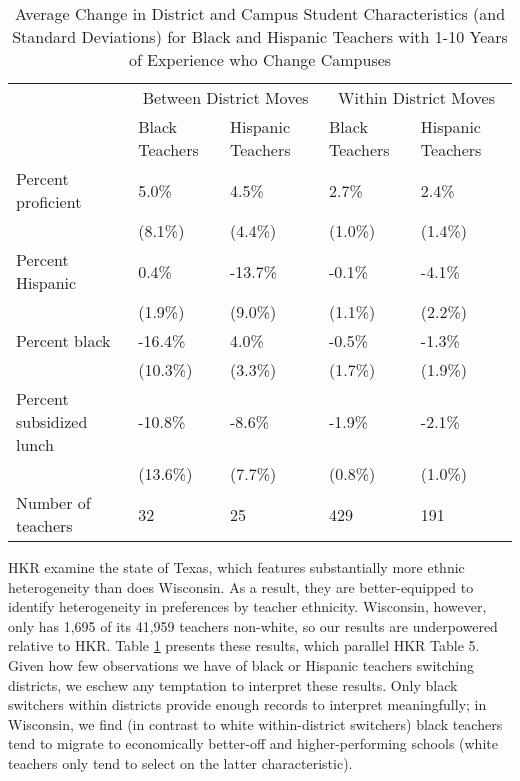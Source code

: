 \documentclass[12pt,]{article}
\begin{document}
\begin{table}[htbp]
\centering
\begin{tabular}{lp{}p{}p{}p{}}
  \hline
 & \multicolumn{2}{c}{Between District Moves} & \multicolumn{2}{c}{Within District Moves}\\ \cline{2-5}
 & Black Teachers & Hispanic Teachers & Black Teachers & Hispanic Teachers \\
  \hline
Percent proficient & 5.0\% & 4.5\% & 2.7\% & 2.4\% \\ 
   & (8.1\%) & (4.4\%) & (1.0\%) & (1.4\%) \\ 
  Percent Hispanic & 0.4\% & -13.7\% & -0.1\% & -4.1\% \\ 
   & (1.9\%) & (9.0\%) & (1.1\%) & (2.2\%) \\ 
  Percent black & -16.4\% & 4.0\% & -0.5\% & -1.3\% \\ 
   & (10.3\%) & (3.3\%) & (1.7\%) & (1.9\%) \\ 
  Percent subsidized lunch & -10.8\% & -8.6\% & -1.9\% & -2.1\% \\ 
   & (13.6\%) & (7.7\%) & (0.8\%) & (1.0\%) \\ 
  Number of teachers & 32 & 25 & 429 & 191 \\ 
   \hline
\end{tabular}
\caption{Average Change in District and Campus Student Characteristics (and Standard Deviations) for Black and Hispanic Teachers with 1-10 Years of Experience who Change Campuses} 
\label{tbl:change_by_eth}
\end{table}

HKR examine the state of Texas, which features substantially more ethnic
heterogeneity than does Wisconsin. As a result, they are better-equipped
to identify heterogeneity in preferences by teacher ethnicity.
Wisconsin, however, only has 1,695 of its 41,959 teachers non-white, so
our results are underpowered relative to HKR. Table
\ref{tbl:change_by_eth} presents these results, which parallel HKR Table
5. Given how few observations we have of black or Hispanic teachers
switching districts, we eschew any temptation to interpret these
results. Only black switchers within districts provide enough records to
interpret meaningfully; in Wisconsin, we find (in contrast to white
within-district switchers) black teachers tend to migrate to
economically better-off and higher-performing schools (white teachers
only tend to select on the latter characteristic).
\end{document}
